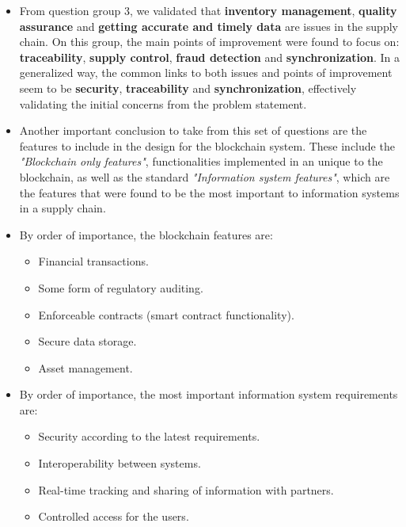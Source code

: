 \begin{itemize}
    \item From question group 3, we validated that \textbf{inventory management}, \textbf{quality assurance} and \textbf{getting accurate and timely data} are issues in the supply chain. On this group, the main points of improvement were found to focus on: \textbf{traceability}, \textbf{supply control}, \textbf{fraud detection} and \textbf{synchronization}. In a generalized way, the common links to both issues and points of improvement seem to be \textbf{security}, \textbf{traceability} and \textbf{synchronization}, effectively validating the initial concerns from the problem statement.
    \item Another important conclusion to take from this set of questions are the features to include in the design for the blockchain system. These include the \textit{"Blockchain only features"}, functionalities implemented in an unique to the blockchain, as well as the standard \textit{"Information system features"}, which are the features that were found to be the most important to information systems in a supply chain.
    \item By order of importance, the blockchain features are:
    \begin{itemize}
        \item Financial transactions.
        \item Some form of regulatory auditing.
        \item Enforceable contracts (smart contract functionality).
        \item Secure data storage.
        \item Asset management.
    \end{itemize}
    \item By order of importance, the most important information system requirements are:
    \begin{itemize}
        \item Security according to the latest requirements.
        \item Interoperability between systems.
        \item Real-time tracking and sharing of information with partners.
        \item Controlled access for the users.
    \end{itemize}
\end{itemize}











